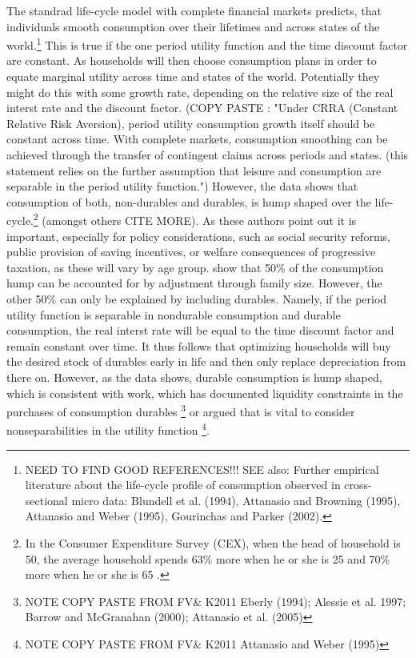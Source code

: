 \documentclass[a4paper,12pt,legno]{article}
\begin{document}
The standrad life-cycle model with complete financial markets predicts, that individuals smooth consumption over their lifetimes and across states of the world.\footnote{NEED TO FIND GOOD REFERENCES!!! SEE also: Further empirical literature about the life-cycle profile of consumption observed in cross-sectional micro data: Blundell et al. (1994), Attanasio and Browning (1995), Attanasio and Weber (1995), Gourinchas and Parker (2002).  } This is true if the one period utility function and the time discount factor are constant. As  households will then choose consumption plans in order to equate marginal utility across time and states of the world. Potentially they might do this with some growth rate, depending on the relative size of the real interst rate and the discount factor. (COPY PASTE \citep{FV&K2011}: "Under CRRA (Constant Relative Risk Aversion), period utility consumption growth itself should be constant across time. With complete markets, consumption smoothing can be achieved through the transfer of contingent claims across periods and states. (this statement relies on the further assumption that leisure and consumption are separable in the period utility function.") However, the data shows that consumption of both, non-durables and durables, is hump shaped over the life-cycle.\footnote{In the Consumer Expenditure Survey (CEX), when the head of household is 50, the average household spends 63\% more when he or she is 25 and 70\% more when he or she is 65 \citep{FV&K2011}.} (amongst others CITE MORE). As these authors point out it is important, especially for policy considerations, such as social security reforms, public provision of saving incentives, or welfare consequences of progressive taxation, as these will vary by age group. \cite{FV&K2011} show that 50\% of the consumption hump can be accounted for by adjustment through family size. However, the other 50\% can only be explained by including durables. Namely, if the period utility function is separable in nondurable consumption and durable consumption, the real interst rate will be equal to the time discount factor and remain constant over time. It thus follows that optimizing households will buy the desired stock of durables early in life and then only replace depreciation from there on. However, as the data shows, durable consumption is hump shaped, which is consistent with work, which has documented liquidity constraints in the purchases of consumption durables \footnote{NOTE COPY PASTE FROM FV\& K2011 Eberly (1994); Alessie et al. 1997; Barrow and McGranahan (2000); Attanasio et al. (2005)} or argued that is vital to consider nonseparabilities in the utility function \footnote{NOTE COPY PASTE FROM FV\& K2011 Attanasio and Weber (1995)}.
\end{document}
